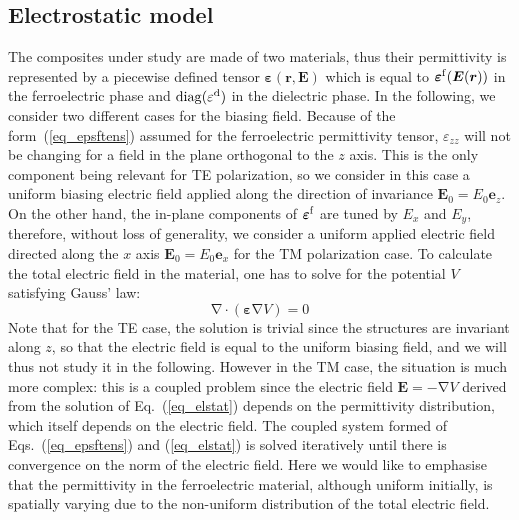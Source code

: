 \documentclass[%
 aip,
 amsmath,amssymb,
 reprint,%
linenumbers
]{revtex4-1}
\newcommand{\B}{\boldsymbol}
\newcommand{\tens}[1]{\B{#1}}
\newcommand{\grad}{\B{\mathrm{\nabla}}}
\renewcommand{\div}{\B{\mathrm{\nabla\cdotp}}}
\newcommand{\epsftens}{\tens{\varepsilon}^{\rm f}}
\newcommand{\epstens}{\tens{\varepsilon}}
\newcommand{\epsd}{\varepsilon^{\rm d}}
\newcommand{\equ}[1]{Eq.~(\ref{#1})}
\newcommand{\co}[1]{\textcolor{correction}{#1}}
\begin{document}
\subsection{Electrostatic model}
The composites under study are made of two materials, thus their permittivity
is represented by a piecewise defined tensor $\epstens(\B r, \B E)$ which is
equal to $\epsftens(\B E(\B r))$ in the ferroelectric phase and ${\rm diag}(\epsd)$
in the dielectric phase.
In the following, we consider two different cases for the biasing field.
Because of the form~(\ref{eq_epsftens}) assumed for the ferroelectric permittivity
tensor, $\varepsilon_{zz}$ will not be changing for a field in the plane orthogonal
to the $z$ axis. This is the only component
being relevant for TE polarization, so we consider in this case a uniform biasing
electric field applied along the direction of invariance $\B E_0 = E_{0} \B e_z$.
On the other hand,
the in-plane components of $\epsftens$ are tuned by $E_x$ and $E_y$, therefore,
without loss of generality,
we consider a uniform applied electric field directed along the $x$ axis
$\B E_0 = E_{0} \B e_x$ for the TM polarization case.
To calculate the total electric field in the material, \co{one
has to solve for the potential $V$ satisfying Gauss' law:}
\begin{equation}
 \div (\epstens \grad V) = 0
 \label{eq_elstat}
\end{equation}
Note that for the TE case, the solution is trivial since the structures
are invariant along $z$, so that the electric field is equal to the uniform biasing field, and
we will thus not study it in the following.
However in the TM case, the situation is much more complex: this is a coupled problem since the
electric field $\B E=-\grad V$ derived from the
solution of \equ{eq_elstat} depends on the permittivity distribution, which
itself depends on the electric field.
The coupled system formed
of Eqs.~(\ref{eq_epsftens}) and (\ref{eq_elstat}) is solved iteratively until there
is convergence on the norm of the electric field.
Here we would like to emphasise that the permittivity in the ferroelectric material, although
uniform initially, is spatially varying due to the non-uniform distribution
of the total electric field.\\



\end{document}
